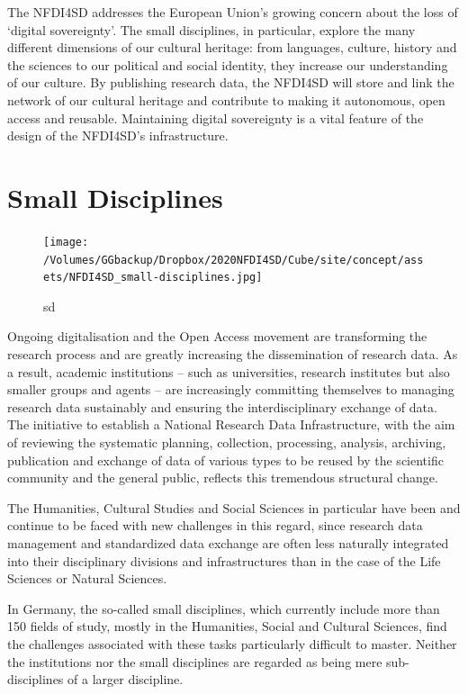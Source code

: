 \documentclass[
  english,
  paper=a4,
  oneside,captions=tableheading
]{scrbook}
\begin{document}
The NFDI4SD addresses the European Union's growing concern about the
loss of `digital sovereignty'. The small disciplines, in particular,
explore the many different dimensions of our cultural heritage: from
languages, culture, history and the sciences to our political and social
identity, they increase our understanding of our culture. By publishing
research data, the NFDI4SD will store and link the network of our
cultural heritage and contribute to making it autonomous, open access
and reusable. Maintaining digital sovereignty is a vital feature of the
design of the NFDI4SD's infrastructure.

\hypertarget{small-disciplines}{%
\section{Small Disciplines}\label{small-disciplines}}

\begin{figure}
\centering
\texttt{[image: /Volumes/GGbackup/Dropbox/2020NFDI4SD/Cube/site/concept/assets/NFDI4SD\_small-disciplines.jpg]}
\caption{sd}
\end{figure}

Ongoing digitalisation and the Open Access movement are transforming the
research process and are greatly increasing the dissemination of
research data. As a result, academic institutions -- such as
universities, research institutes but also smaller groups and agents --
are increasingly committing themselves to managing research data
sustainably and ensuring the interdisciplinary exchange of data. The
initiative to establish a National Research Data Infrastructure, with
the aim of reviewing the systematic planning, collection, processing,
analysis, archiving, publication and exchange of data of various types
to be reused by the scientific community and the general public,
reflects this tremendous structural change.

The Humanities, Cultural Studies and Social Sciences in particular have
been and continue to be faced with new challenges in this regard, since
research data management and standardized data exchange are often less
naturally integrated into their disciplinary divisions and
infrastructures than in the case of the Life Sciences or Natural
Sciences.

In Germany, the so-called small disciplines, which currently include
more than 150 fields of study, mostly in the Humanities, Social and
Cultural Sciences, find the challenges associated with these tasks
particularly difficult to master. Neither the institutions nor the small
disciplines are regarded as being mere sub-disciplines of a larger
discipline.
\end{document}
